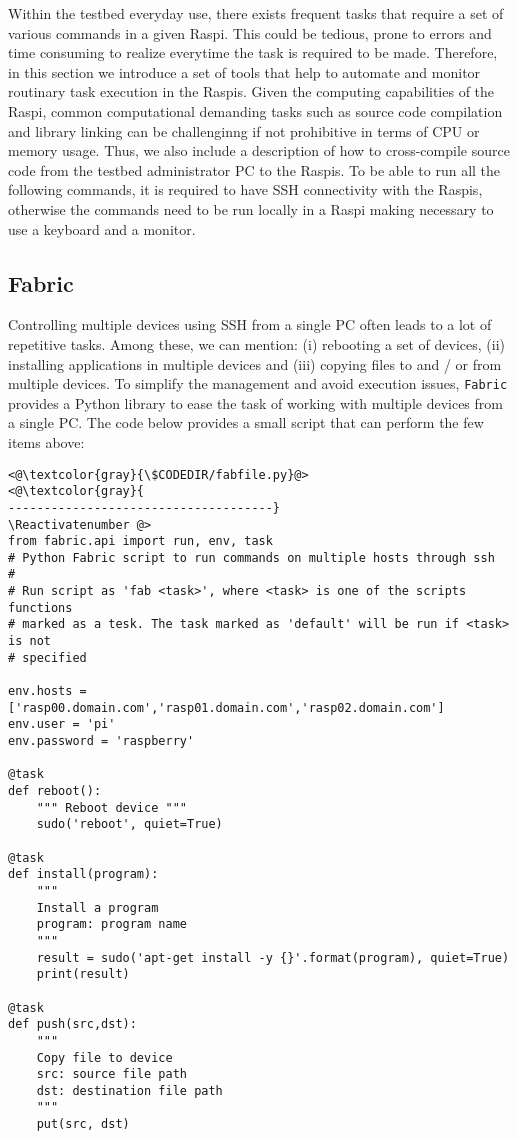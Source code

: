 
\label{sec:tools}
Within the testbed everyday use, there exists frequent tasks that require
a set of various commands in a given \ac{Raspi}. This could be tedious, prone
to errors and time consuming to realize everytime the task is required to be
made. Therefore, in this section we introduce a set of tools that help to
automate and monitor routinary task execution in the \ac{Raspi}s. Given the
computing capabilities of the \ac{Raspi}, common computational demanding tasks
such as source code compilation and library linking can be challenginng if
not prohibitive in terms of \ac{CPU} or memory usage. Thus, we also include
a description of how to cross-compile source code from the testbed
administrator \ac{PC} to the \ac{Raspi}s. To be able to run all the following
commands, it is required to have \ac{SSH} connectivity with the \ac{Raspi}s,
otherwise the commands need to be run locally in a \ac{Raspi} making
necessary to use a keyboard and a monitor.


\subsection{Fabric}
Controlling multiple devices using \ac{SSH} from a single \ac{PC}
often leads to a lot of repetitive tasks. Among these, we can mention:
(i) rebooting a set of devices, (ii) installing applications in multiple
devices and (iii) copying files to and / or from multiple devices. To
simplify the management and avoid execution issues, \texttt{Fabric} provides
a Python library to ease the task of working with multiple devices from
a single \ac{PC}. The code below provides a small script that can perform
the few items above:

\Suppressnumber\begin{lstlisting}[]
<@\textcolor{gray}{\$CODEDIR/fabfile.py}@>
<@\textcolor{gray}{
-------------------------------------}
\Reactivatenumber @>
from fabric.api import run, env, task
# Python Fabric script to run commands on multiple hosts through ssh
#
# Run script as 'fab <task>', where <task> is one of the scripts functions
# marked as a tesk. The task marked as 'default' will be run if <task> is not
# specified

env.hosts = ['rasp00.domain.com','rasp01.domain.com','rasp02.domain.com']
env.user = 'pi'
env.password = 'raspberry'

@task
def reboot():
    """ Reboot device """
    sudo('reboot', quiet=True)

@task
def install(program):
    """
    Install a program
    program: program name
    """
    result = sudo('apt-get install -y {}'.format(program), quiet=True)
    print(result)

@task
def push(src,dst):
    """
    Copy file to device
    src: source file path
    dst: destination file path
    """
    put(src, dst)

\end{lstlisting}
\FloatBarrier

